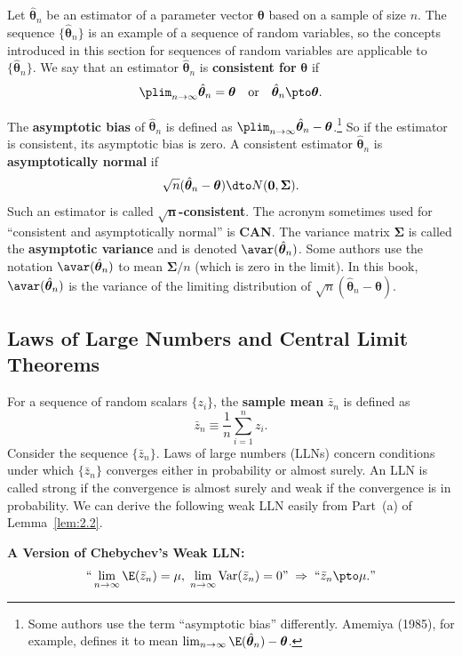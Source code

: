 Let $\hat{\bm{\theta}}_n$ be an estimator of a parameter vector $\bm{\theta}$ based
on a sample of size $n$.  The sequence $\{\hat{\bm{\theta}}_n\}$ is an example of a
sequence of random variables, so the concepts introduced in this section for
sequences of random variables are applicable to $\{\hat{\bm{\theta}}_n\}$.  We say
that an estimator $\hat{\bm{\theta}}_n$ is \textbf{consistent for} $\bm{\theta}$ if
\[
  \plim_{n \to \infty} \hat{\bm{\theta}}_n = \bm{\theta} \quad \text{or} \quad
  \hat{\bm{\theta}}_n \pto \bm{\theta}.
\]

The \textbf{asymptotic bias} of $\hat{\bm{\theta}}_n$ is defined as
$\plim_{n \to \infty} \hat{\bm{\theta}}_n - \bm{\theta}$.\footnote{Some authors use
the term ``asymptotic bias'' differently.  Amemiya (1985), for example, defines it
to mean $\lim_{n \to \infty} \E(\hat{\bm{\theta}}_n) - \bm{\theta}$.}
So if the estimator is consistent, its asymptotic bias is zero.  A consistent
estimator $\hat{\bm{\theta}}_n$ is \textbf{asymptotically normal} if
\[
  \sqrt{n}(\hat{\bm{\theta}}_n - \bm{\theta}) \dto N(\mathbf{0}, \bm{\Sigma}).
\]
Such an estimator is called $\bm{\sqrt{n}}$\textbf{-consistent}.  The acronym
sometimes used for ``consistent and asymptotically normal'' is \textbf{CAN}.  The
variance matrix $\bm{\Sigma}$ is called the \textbf{asymptotic variance} and is
denoted $\avar(\hat{\bm{\theta}}_n)$.  Some authors use the notation
$\avar(\hat{\bm{\theta}}_n)$ to mean $\bm{\Sigma}/n$ (which is zero in the limit).
In this book, $\avar(\hat{\bm{\theta}}_n)$ is the variance of the limiting
distribution of $\sqrt{n}(\hat{\bm{\theta}}_n - \bm{\theta})$.

\subsection*{Laws of Large Numbers and Central Limit Theorems}

For a sequence of random scalars $\{z_i\}$, the \textbf{sample mean}
$\bar{z}_n$ is defined as
\[
  \bar{z}_n \equiv \frac{1}{n} \sum_{i=1}^{n} z_i.
\]
Consider the sequence $\{\bar{z}_n\}$.  Laws of large numbers (LLNs) concern
conditions under which $\{\bar{z}_n\}$ converges either in probability or almost
surely.  An LLN is called strong if the convergence is almost surely and weak if
the convergence is in probability.  We can derive the following weak LLN easily
from Part~(a) of Lemma~\ref{lem:2.2}.

\medskip
\noindent\textbf{A Version of Chebychev's Weak LLN:}
\[
  \text{``}\lim_{n \to \infty} \E(\bar{z}_n) = \mu,\;
  \lim_{n \to \infty} \Var(\bar{z}_n) = 0\text{''} \;\Rightarrow\;
  \text{``}\bar{z}_n \pto \mu.\text{''}
\]

